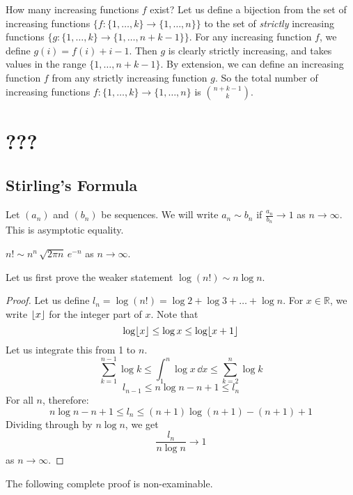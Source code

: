 \documentclass{article}
\begin{document}
How many increasing functions $f$ exist? Let us define a bijection from the set of increasing functions $\{f\colon \{1, \dots, k\} \to \{1, \dots, n\}\}$ to the set of \textit{strictly} increasing functions $\{g\colon \{1, \dots, k\} \to \{1, \dots, n+k-1\}\}$. For any increasing function $f$, we define $g(i) = f(i) + i - 1$. Then $g$ is clearly strictly increasing, and takes values in the range $\{1, \dots, n+k-1\}$. By extension, we can define an increasing function $f$ from any strictly increasing function $g$. So the total number of increasing functions $f\colon \{1, \dots, k\} \to \{1, \dots, n\}$ is $\binom{n+k-1}{k}$.

\section{???}
\subsection{Stirling's Formula}
Let $(a_n)$ and $(b_n)$ be sequences. We will write $a_n \sim b_n$ if $\frac{a_n}{b_n} \to 1$ as $n \to \infty$. This is asymptotic equality.
\begin{theorem}
    $n! \sim n^n\, \sqrt{2 \pi n}\, e^{-n}$ as $n \to \infty$.
\end{theorem}
\noindent Let us first prove the weaker statement $\log (n!) \sim n \log n$.
\begin{proof}
    Let us define $l_n = \log (n!) = \log 2 + \log 3 + \dots + \log n$. For $x \in \mathbb R$, we write $\lfloor x\rfloor$ for the integer part of $x$. Note that
    \[ \log \lfloor x\rfloor \leq \log x \leq \log \lfloor x+1\rfloor \]
    Let us integrate this from 1 to $n$.
    \[ \sum_{k=1}^{n-1} \log k \leq \int_1^n \log x\, \dd x \leq \sum_{k=2}^{n} \log k \]
    \[ l_{n-1} \leq n \log n - n + 1 \leq l_n \]
    For all $n$, therefore:
    \[ n \log n - n + 1 \leq l_n \leq (n+1) \log (n+1) - (n+1) + 1 \]
    Dividing through by $n\log n$, we get
    \[ \frac{l_n}{n \log n} \to 1 \]
    as $n \to \infty$.
\end{proof}
\noindent The following complete proof is non-examinable.
\end{document}
